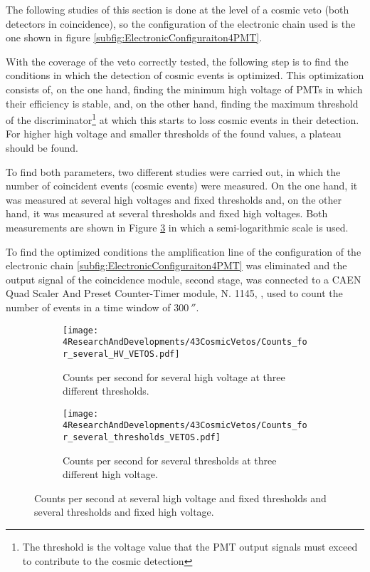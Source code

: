 The following studies of this section is done at the level of a cosmic veto (both detectors in coincidence), so the configuration of the electronic chain used is the one shown in figure \ref{subfig:ElectronicConfiguraiton4PMT}.

With the coverage of the veto correctly tested, the following step is to find the conditions in which the detection of cosmic events is optimized. This optimization consists of, on the one hand, finding the minimum high voltage of PMTs in which their efficiency is stable, and, on the other hand, finding the maximum threshold of the discriminator\footnote{The threshold is the voltage value that the PMT output signals must exceed to contribute to the cosmic detection} at which this starts to loss cosmic events in their detection. For higher high voltage and smaller thresholds of the found values, a plateau should be found.

To find both parameters, two different studies were carried out, in which the number of coincident events (cosmic events) were measured. On the one hand, it was measured at several high voltages and fixed thresholds and, on the other hand, it was measured at several thresholds and fixed high voltages. Both measurements are shown in Figure \ref{fig:HVandThresholdsPLateaus} in which a semi-logarithmic scale is used.

To find the optimized conditions the amplification line of the configuration of the electronic chain \ref{subfig:ElectronicConfiguraiton4PMT} was eliminated and the output signal of the coincidence module, second stage, was connected to a CAEN Quad Scaler And Preset Counter-Timer module, N. 1145, \cite{ScalerDataSheet}, used to count the number of events in a time window of $300~\second$.

\begin{figure}
\centering
    \begin{subfigure}[b]{0.8\textwidth}
    \centering
    \texttt{[image: 4ResearchAndDevelopments/43CosmicVetos/Counts\_for\_several\_HV\_VETOS.pdf]}  
    \caption{Counts per second for several high voltage at three different thresholds.\label{subfig:HVPLateauVetos}}
    \end{subfigure}
    \hfill
    \begin{subfigure}[b]{0.8\textwidth}
    \centering
    \texttt{[image: 4ResearchAndDevelopments/43CosmicVetos/Counts\_for\_several\_thresholds\_VETOS.pdf]}  
    \caption{Counts per second for several thresholds at three different high voltage.\label{subfig:ThresholdsPlateau}}
    \end{subfigure}
 \caption{Counts per second at several high voltage and fixed thresholds and several thresholds and fixed high voltage.}
 \label{fig:HVandThresholdsPLateaus}
\end{figure}

